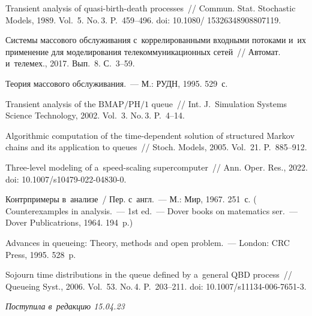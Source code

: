 \begin{multicols}{2}
{{\begin{thebibliography}{99}
 Transient analysis of quasi-birth-death processes~//
Commun. Stat. Stochastic Models, 1989. Vol.~5. No.\,3. P.~459--496. 
doi: 10.1080/ 15326348908807119.

 Системы массового обслуживания с~коррелированными
входными потоками и~их применение для моделирования телекоммуникационных сетей~// Автомат. и~телемех., 2017. Вып.~8. С.~3--59.


Теория массового обслуживания.~--- М.: РУДН, 1995. 529~с.

Transient analysis of the ${\mathrm{BMAP}/\mathrm{PH}/1}$ queue~//
Int. J.~Simulation Systems Science Technology, 2002. 
Vol.~3. No.\,3. P.~4--14.

Algorithmic computation of the time-dependent solution of
structured Markov chains and its application to queues~//
Stoch. Models, 2005. Vol.~21. P.~885--912.

\pagebreak

Three-level modeling of a~speed-scaling supercomputer~// Ann. Oper. Res., 2022. 
doi: 10.1007/s10479-022-\linebreak \mbox{04830-0}.

 Контрпримеры в~анализе~/ Пер. с~англ.~--- М.: Мир, 1967. 251~с.
( 
{Counterexamples in analysis}.~--- 1st ed.~---
 Dover books on matematics ser.~--- Dover Publicatrions, 1964. 194~p.)


 Advances in queueing: Theory, methods and open problem.~--- London: CRC Press, 1995. 528~p.

 Sojourn time distributions in the queue defined by a~general QBD process~//
Queueing Syst., 2006. Vol.~53. No.\,4. P.~203--211. doi: 10.1007/s11134-006-7651-3.

\end{thebibliography}

 }
 }

\end{multicols}

\vspace*{-6pt}

\hfill{\small\textit{Поступила в~редакцию 15.04.23}}

